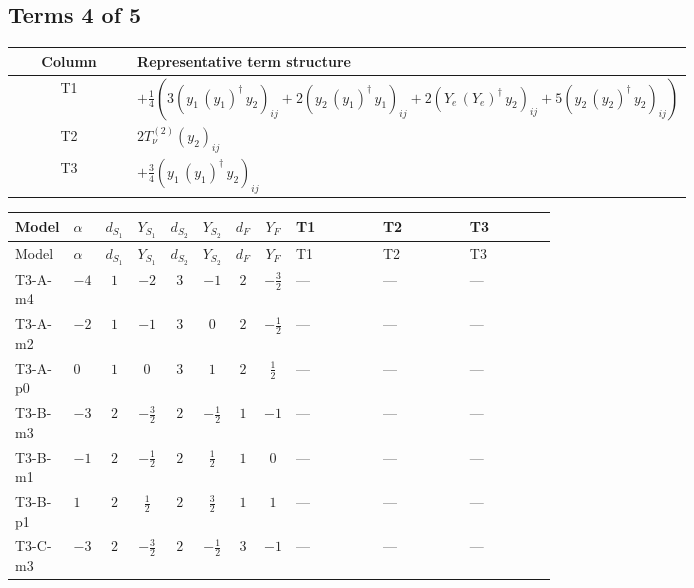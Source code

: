 \documentclass[8pt]{article}
\begin{document}
\begin{landscape}
\subsection*{Terms 4 of 5}
\begin{center}
\begin{tabular}{@{}c >{\raggedright\arraybackslash}p{0.82\linewidth}@{}}
\toprule
Column & Representative term structure \\
\midrule
T1 & \(\displaystyle +\frac{1}{4} (3 \left({y_1}\,\left({y_1}\right)^{\dagger}\,{y_2}\right)_{ij}+2 \left({y_2}\,\left({y_1}\right)^{\dagger}\,{y_1}\right)_{ij}+2 \left({Y_e}\,\left({Y_e}\right)^{\dagger}\,{y_2}\right)_{ij}+5 \left({y_2}\,\left({y_2}\right)^{\dagger}\,{y_2}\right)_{ij})\) \\
\midrule
T2 & \(\displaystyle 2 T_{\nu}^{(2)} \left({y_2}\right)_{ij}\) \\
\midrule
T3 & \(\displaystyle +\frac{3}{4} \left({y_1}\,\left({y_1}\right)^{\dagger}\,{y_2}\right)_{ij}\) \\
\midrule
\bottomrule
\end{tabular}
\end{center}
\smallskip
\tiny
\begin{longtable}{@{}llcccccc >{\raggedright\arraybackslash}p{0.21\linewidth} >{\raggedright\arraybackslash}p{0.21\linewidth} >{\raggedright\arraybackslash}p{0.21\linewidth}@{}}
\toprule
Model & $\alpha$ & $d_{S_1}$ & $Y_{S_1}$ & $d_{S_2}$ & $Y_{S_2}$ & $d_F$ & $Y_F$ & T1 & T2 & T3 \\
\midrule
\endfirsthead
\toprule
Model & $\alpha$ & $d_{S_1}$ & $Y_{S_1}$ & $d_{S_2}$ & $Y_{S_2}$ & $d_F$ & $Y_F$ & T1 & T2 & T3 \\
\midrule
\endhead
T3-A-m4 & $-4$ & $1$ & $-2$ & $3$ & $-1$ & $2$ & $-\frac{3}{2}$ & --- & --- & --- \\
\midrule
T3-A-m2 & $-2$ & $1$ & $-1$ & $3$ & $0$ & $2$ & $-\frac{1}{2}$ & --- & --- & --- \\
\midrule
T3-A-p0 & $0$ & $1$ & $0$ & $3$ & $1$ & $2$ & $\frac{1}{2}$ & --- & --- & --- \\
\midrule
T3-B-m3 & $-3$ & $2$ & $-\frac{3}{2}$ & $2$ & $-\frac{1}{2}$ & $1$ & $-1$ & --- & --- & --- \\
\midrule
T3-B-m1 & $-1$ & $2$ & $-\frac{1}{2}$ & $2$ & $\frac{1}{2}$ & $1$ & $0$ & --- & --- & --- \\
\midrule
T3-B-p1 & $1$ & $2$ & $\frac{1}{2}$ & $2$ & $\frac{3}{2}$ & $1$ & $1$ & --- & --- & --- \\
\midrule
T3-C-m3 & $-3$ & $2$ & $-\frac{3}{2}$ & $2$ & $-\frac{1}{2}$ & $3$ & $-1$ & --- & --- & --- \\

\end{longtable}
\end{landscape}
\end{document}

